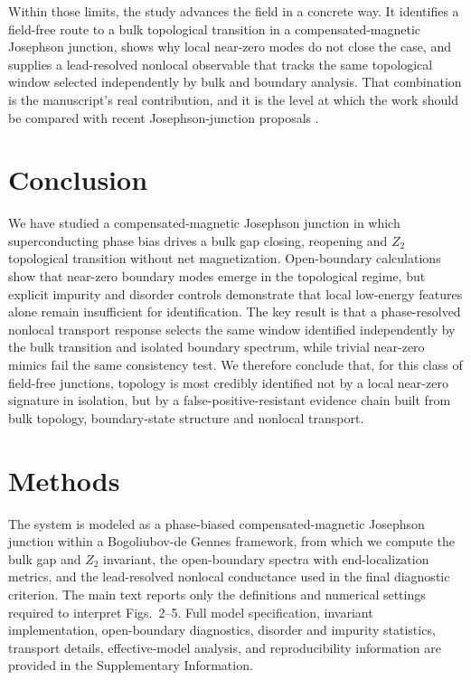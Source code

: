 \documentclass[11pt]{article}
\begin{document}
Within those limits, the study advances the field in a concrete way. It identifies a field-free route to a bulk topological transition in a compensated-magnetic Josephson junction, shows why local near-zero modes do not close the case, and supplies a lead-resolved nonlocal observable that tracks the same topological window selected independently by bulk and boundary analysis. That combination is the manuscript's real contribution, and it is the level at which the work should be compared with recent Josephson-junction proposals \cite{planar-jj-topological-sc,compensated-magnetic-jj-tajj-2026,nonlocal-majorana-diagnostic-theory}.


\section{Conclusion}

We have studied a compensated-magnetic Josephson junction in which superconducting phase bias drives a bulk gap closing, reopening and $Z_2$ topological transition without net magnetization. Open-boundary calculations show that near-zero boundary modes emerge in the topological regime, but explicit impurity and disorder controls demonstrate that local low-energy features alone remain insufficient for identification. The key result is that a phase-resolved nonlocal transport response selects the same window identified independently by the bulk transition and isolated boundary spectrum, while trivial near-zero mimics fail the same consistency test. We therefore conclude that, for this class of field-free junctions, topology is most credibly identified not by a local near-zero signature in isolation, but by a false-positive-resistant evidence chain built from bulk topology, boundary-state structure and nonlocal transport.

\section{Methods}

The system is modeled as a phase-biased compensated-magnetic Josephson junction within a Bogoliubov-de Gennes framework, from which we compute the bulk gap and $Z_2$ invariant, the open-boundary spectra with end-localization metrics, and the lead-resolved nonlocal conductance used in the final diagnostic criterion. The main text reports only the definitions and numerical settings required to interpret Figs.~2--5. Full model specification, invariant implementation, open-boundary diagnostics, disorder and impurity statistics, transport details, effective-model analysis, and reproducibility information are provided in the Supplementary Information.
\end{document}
